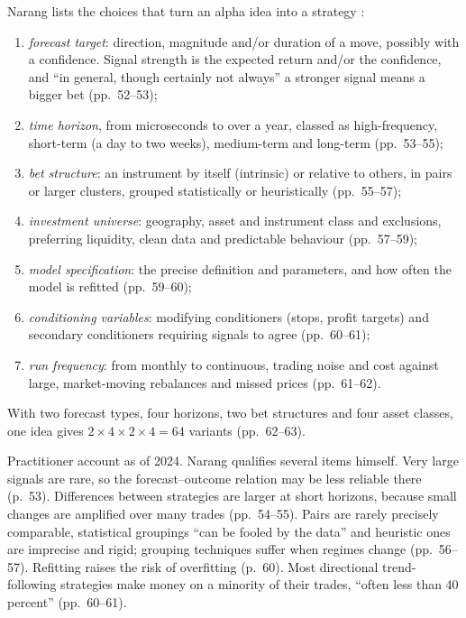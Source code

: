 \begin{qfmethod}\label{meth:alpha-strategy-specification}
 Narang lists the choices that turn an alpha idea into a strategy \citep[chap.~3, sec.~3.4, pp.~52--63]{s7-narang}:
\begin{enumerate}
\item \emph{forecast target}: direction, magnitude and/or duration of a move, possibly with a confidence. Signal strength is the expected return and/or the confidence, and ``in general, though certainly not always'' a stronger signal means a bigger bet (pp.~52--53);
\item \emph{time horizon}, from microseconds to over a year, classed as high-frequency, short-term (a day to two weeks), medium-term and long-term (pp.~53--55);
\item \emph{bet structure}: an instrument by itself (intrinsic) or relative to others, in pairs or larger clusters, grouped statistically or heuristically (pp.~55--57);
\item \emph{investment universe}: geography, asset and instrument class and exclusions, preferring liquidity, clean data and predictable behaviour (pp.~57--59);
\item \emph{model specification}: the precise definition and parameters, and how often the model is refitted (pp.~59--60);
\item \emph{conditioning variables}: modifying conditioners (stops, profit targets) and secondary conditioners requiring signals to agree (pp.~60--61);
\item \emph{run frequency}: from monthly to continuous, trading noise and cost against large, market-moving rebalances and missed prices (pp.~61--62).
\end{enumerate}
With two forecast types, four horizons, two bet structures and four asset classes, one idea gives $2\times4\times2\times4=64$ variants (pp.~62--63).

 Practitioner account as of 2024. Narang qualifies several items himself. Very large signals are rare, so the forecast--outcome relation may be less reliable there (p.~53). Differences between strategies are larger at short horizons, because small changes are amplified over many trades (pp.~54--55). Pairs are rarely precisely comparable, statistical groupings ``can be fooled by the data'' and heuristic ones are imprecise and rigid; grouping techniques suffer when regimes change (pp.~56--57). Refitting raises the risk of overfitting (p.~60). Most directional trend-following strategies make money on a minority of their trades, ``often less than 40 percent'' (pp.~60--61).


\end{qfmethod}
